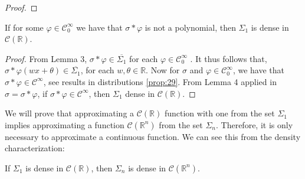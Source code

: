 \documentclass[../main.tex]{subfiles}
\begin{document}
\begin{proof}
		
	\end{proof}
	
	\begin{lema} %
		If for some $\varphi \in \mathcal{C}^\infty_0 $ we have that $\sigma \ast \varphi $ is not a polynomial, then $\Sigma_1$ is dense in $\mathcal{C}(\mathbb{R})$.
	\end{lema}
	 \begin{proof}
	 From Lemma 3, $\sigma \ast \varphi \in  \overline{\Sigma_1}$ for each $\varphi \in \mathcal{C}^\infty_0$ . It thus follows that, $\sigma \ast \varphi (wx+\theta ) \in  \overline{\Sigma_1}$, for each $ w, \theta \in \mathbb{R}$. Now for $\sigma$ and $\varphi \in \mathcal{C}^\infty_0$, we have that $\sigma \ast \varphi \in  \mathcal{C}^\infty $, see results in distributions \ref{prop:29}.
	 From Lemma 4 applied in $\sigma= \sigma \ast \varphi$, if $\sigma \ast \varphi \in  \mathcal{C}^\infty $, then $\Sigma_1$ dense in $\mathcal{C} (\mathbb{R})$. 
	 \end{proof}
 
 \noindent We will prove that approximating a $\mathcal{C}(\mathbb{R})$ function  with one from the set $\Sigma_1$ implies approximating a function $\mathcal{C}(\mathbb{R}^n)$ from the set $\Sigma_n$. Therefore, it is only necessary to approximate a continuous function. We can see this from the density characterization:

	\begin{lema}  %
			If $\Sigma_1$ is dense in $\mathcal{C}(\mathbb{R})$, then $\Sigma_n$ is dense in $\mathcal{C}(\mathbb{R}^n)$. 
		\end{lema}
	
\end{document}
